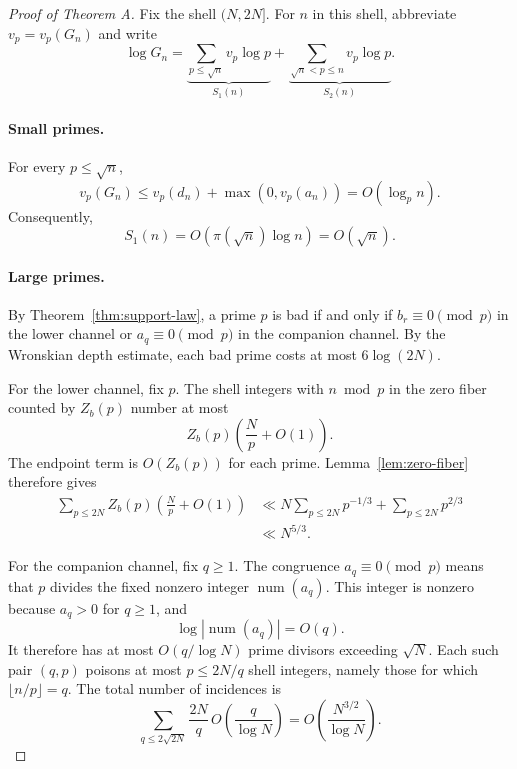 \documentclass[11pt]{amsart}
\DeclareMathOperator{\num}{num}
\theoremstyle{plain}
\theoremstyle{remark}
\begin{document}
\begin{proof}[Proof of Theorem A]
Fix the shell $(N,2N]$.  For $n$ in this shell, abbreviate
$v_p=v_p(G_n)$ and write
\[
 \log G_n
 =\underbrace{\sum_{p\leq\sqrt n}v_p\log p}_{S_1(n)}
 +\underbrace{\sum_{\sqrt n<p\leq n}v_p\log p}_{S_2(n)}.
\]

\paragraph{Small primes.}
For every $p\leq\sqrt n$,
\[
 v_p(G_n)\leq v_p(d_n)+\max(0,v_p(a_n))=O(\log_p n).
\]
Consequently,
\[
 S_1(n)=O(\pi(\sqrt n)\log n)=O(\sqrt n).
\]

\paragraph{Large primes.}
By Theorem~\ref{thm:support-law}, a prime $p$ is bad if and only if
$b_r\equiv0\pmod p$ in the lower channel or
$a_q\equiv0\pmod p$ in the companion channel.  By the Wronskian depth
estimate, each bad prime costs at most $6\log(2N)$.

For the lower channel, fix $p$.  The shell integers with
$n\bmod p$ in the zero fiber counted by $Z_b(p)$ number at most
\[
 Z_b(p)\left(\frac Np+O(1)\right).
\]
The endpoint term is $O(Z_b(p))$ for each prime.  Lemma~\ref{lem:zero-fiber}
therefore gives
\begin{align*}
 \sum_{p\leq2N}Z_b(p)\left(\frac Np+O(1)\right)
 &\ll N\sum_{p\leq2N}p^{-1/3}
     +\sum_{p\leq2N}p^{2/3}\\
 &\ll N^{5/3}.
\end{align*}

For the companion channel, fix $q\geq1$.  The congruence
$a_q\equiv0\pmod p$ means that $p$ divides the fixed nonzero integer
$\num(a_q)$.  This integer is nonzero because $a_q>0$ for $q\geq1$, and
\[
 \log|\num(a_q)|=O(q).
\]
It therefore has at most $O(q/\log N)$ prime divisors exceeding
$\sqrt N$.  Each such pair $(q,p)$ poisons at most
$p\leq2N/q$ shell integers, namely those for which
$\lfloor n/p\rfloor=q$.  The total number of incidences is
\[
 \sum_{q\leq2\sqrt{2N}}
 \frac{2N}{q}\,O\left(\frac q{\log N}\right)
 =O\left(\frac{N^{3/2}}{\log N}\right).
\]


\end{proof}
\end{document}

